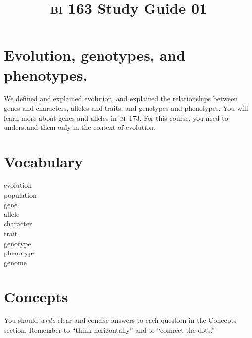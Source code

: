 \documentclass[letterpaper]{tufte-handout}
\title{{\scshape bi} 163 Study Guide 01}
\date{} %
\begin{document}
\maketitle	%

\section*{Evolution, genotypes, and phenotypes.}

We defined and explained evolution, and explained the relationships between genes and characters, alleles and traits, and genotypes and phenotypes. You will learn more about genes and alleles in~{\scshape bi}~173. For this course, you need to understand them only in the context of evolution.

\section*{Vocabulary}

\vspace{-1\baselineskip}
\begin{multicols}{2}
evolution\\
population \\
gene \\
allele \\
character \\
trait \\
genotype \\
phenotype \\
genome
\end{multicols}

\section*{Concepts}

You should \emph{write} clear and concise answers to each question in the Concepts section.  Remember to ``think horizontally'' and to ``connect the dots.'' 
\end{document}
